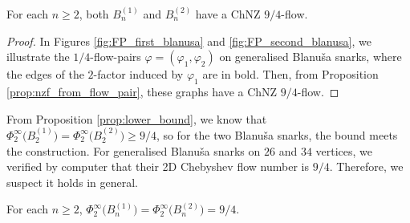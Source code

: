 \begin{proposition}
For each $n\geq 2$, both $B_n^{(1)}$ and $B_n^{(2)}$ have a ChNZ $9/4$-flow. \label{prop:blanusa_chnzf}
\end{proposition}
\begin{proof}
In Figures \ref{fig:FP_first_blanusa} and \ref{fig:FP_second_blanusa}, we illustrate the $1/4$-flow-pairs $\varphi=(\varphi_1, \varphi_2)$ on generalised Blanuša snarks, where the edges of the $2$-factor induced by $\varphi_1$ are in bold. Then, from Proposition \ref{prop:nzf_from_flow_pair}, these graphs have a ChNZ $9/4$-flow.
\end{proof}

From Proposition \ref{prop:lower_bound}, we know that $\Phi_2^\infty\big(B_2^{(1)}\big)=\Phi_2^\infty\big(B_2^{(2)}\big)\geq 9/4$, so for the two Blanuša snarks, the bound meets the construction. For generalised Blanuša snarks on $26$ and $34$ vertices, we verified by computer that their 2D Chebyshev flow number is $9/4$. Therefore, we suspect it holds in general.
\begin{conjecture}
For each $n\geq 2$, $\Phi_2^\infty\big(B_n^{(1)}\big)=\Phi_2^\infty\big(B_n^{(2)}\big) = 9/4$.
\end{conjecture}
